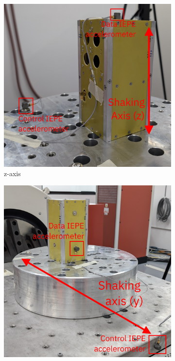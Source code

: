 \documentclass[]{report}
\begin{document}
\begin{figure}[H]
  \begin{subfigure}{0.32\textwidth}
    \includegraphics[width=\linewidth]{images/z-axis-setup.jpg}
    \caption{z-axis}
  \end{subfigure}
  \begin{subfigure}{0.32\textwidth}
    \includegraphics[width=\linewidth]{images/y-axis-setup.jpg}

\end{subfigure}
\end{figure}
\end{document}
